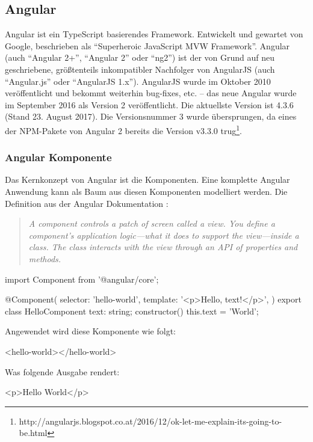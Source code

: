 \subsection{Angular}
Angular ist ein TypeScript basierendes Framework. Entwickelt und gewartet von Google, beschrieben als "`Superheroic JavaScript MVW Framework"'. Angular (auch "`Angular 2+"', "`Angular 2"' oder "`ng2"') ist der von Grund auf neu geschriebene, größtenteils inkompatibler Nachfolger von AngularJS (auch "`Angular.js"' oder "`AngularJS 1.x"').
AngularJS wurde im Oktober 2010 veröffentlicht und bekommt weiterhin bug-fixes, etc. -- das neue Angular wurde im September 2016 als Version 2 veröffentlicht. Die aktuellste Version ist 4.3.6 (Stand 23. August 2017). Die Versionsnummer 3 wurde übersprungen, da eines der NPM-Pakete von Angular 2 bereits die Version v3.3.0 trug\footnote{http://angularjs.blogspot.co.at/2016/12/ok-let-me-explain-its-going-to-be.html}.

\subsubsection{Angular Komponente}
Das Kernkonzept von Angular ist die Komponenten. Eine komplette Angular Anwendung kann als Baum aus diesen Komponenten modelliert werden.
Die Definition aus der Angular Dokumentation \cite{angular-component}: 
\begin{quote}
	\begin{english}
		\textit{A component controls a patch of screen called a view. You define a component's application logic—what it does to support the view—inside a class. The class interacts with the view through an API of properties and methods.}
	\end{english}
\end{quote}

\begin{JsCode}
	import { Component } from '@angular/core';
	
	@Component({
		selector: 'hello-world',
		template: '<p>Hello, {{text}}!</p>',
	})
	export class HelloComponent {
		text: string;
		constructor() {
			this.text = 'World';
		}
	}
\end{JsCode}
Angewendet wird diese Komponente wie folgt:
\begin{JsCode}[numbers=none]
	<hello-world></hello-world>
\end{JsCode}
Was folgende Ausgabe rendert:
\begin{JsCode}Hello World</p>
\end{JsCode}

